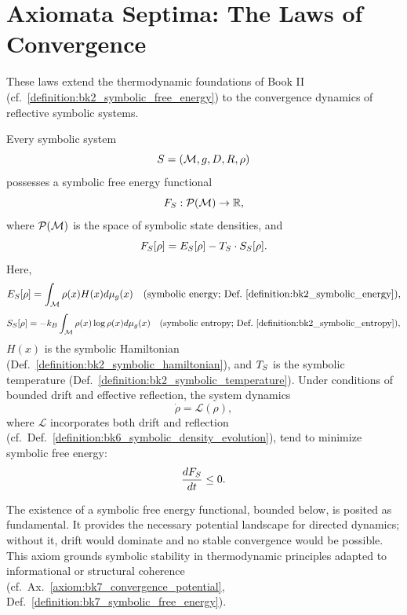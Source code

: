 \section{Axiomata Septima: The Laws of Convergence}
\label{sec:bk7_axiomata_septima_the_laws_of_convergence}
These laws extend the thermodynamic foundations of Book II (cf.~\ref{definition:bk2_symbolic_free_energy}) to the convergence dynamics of reflective symbolic systems.
\begin{axiom}
\label{axiom:bk7_convergence_potential}
Every symbolic system 
\[
S = (\mathcal{M}, g, D, R, \rho)
\]
possesses a symbolic free energy functional
\[
F_S : \mathcal{P}(\mathcal{M}) \to \mathbb{R},
\]
where \( \mathcal{P}(\mathcal{M}) \) is the space of symbolic state densities, and
\[
F_S[\rho] = E_S[\rho] - T_S \cdot S_S[\rho].
\]
Here,
\[
E_S[\rho] = \int_{\mathcal{M}} \rho(x) H(x) d\mu_{g}(x)
\quad \text{(symbolic energy; Def.~\ref{definition:bk2_symbolic_energy})},
\]
\[
S_S[\rho] = -k_B \int_{\mathcal{M}} \rho(x) \log \rho(x) d\mu_{g}(x)
\quad \text{(symbolic entropy; Def.~\ref{definition:bk2_symbolic_entropy})},
\]
\( H(x) \) is the symbolic Hamiltonian (Def.~\ref{definition:bk2_symbolic_hamiltonian}), and \( T_S \) is the symbolic temperature (Def.~\ref{definition:bk2_symbolic_temperature}).
Under conditions of bounded drift and effective reflection, the system dynamics
\[
\dot{\rho} = \mathcal{L}(\rho),
\]
where \( \mathcal{L} \) incorporates both drift and reflection (cf.~Def.~\ref{definition:bk6_symbolic_density_evolution}), tend to minimize symbolic free energy:
\[
\frac{dF_S}{dt} \le 0.
\]
\end{axiom}
\begin{remark}
\label{remark:bk7_unnamed_remark_01}
The existence of a symbolic free energy functional, bounded below, is posited as fundamental. It provides the necessary potential landscape for directed dynamics; without it, drift would dominate and no stable convergence would be possible. This axiom grounds symbolic stability in thermodynamic principles adapted to informational or structural coherence (cf.~Ax.~\ref{axiom:bk7_convergence_potential}, Def.~\ref{definition:bk7_symbolic_free_energy}).
\end{remark}
